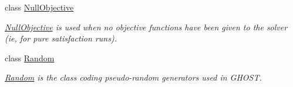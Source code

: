 \begin{DoxyCompactItemize}
class \hyperlink{classghost_1_1NullObjective}{Null\-Objective}
\begin{DoxyCompactList}\small\item\em \hyperlink{classghost_1_1NullObjective}{Null\-Objective} is used when no objective functions have been given to the solver (ie, for pure satisfaction runs). \end{DoxyCompactList}\item 
class \hyperlink{classghost_1_1Random}{Random}
\begin{DoxyCompactList}\small\item\em \hyperlink{classghost_1_1Random}{Random} is the class coding pseudo-\/random generators used in G\-H\-O\-S\-T. \end{DoxyCompactList}\end{DoxyCompactItemize}
